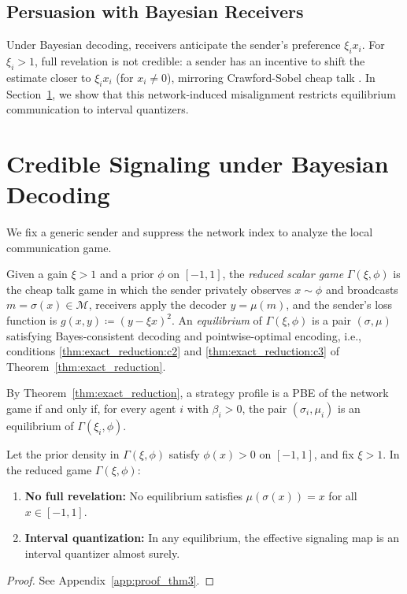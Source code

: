 \documentclass[journal,twoside,web]{ieeecolor}
\begin{document}
\subsection{Persuasion with Bayesian Receivers}
\label{subsec:credibility_gap}

Under Bayesian decoding, receivers anticipate the sender's preference $\xi_i x_i$. For $\xi_i > 1$, full revelation is not credible: a sender has an incentive to shift the estimate closer to $\xi_i x_i$ (for $x_i\neq0$), mirroring Crawford-Sobel cheap talk \cite{crawford1982strategic,melumad1991communication}. In Section~\ref{sec:credible_signaling}, we show that this network-induced misalignment restricts equilibrium communication to interval quantizers.

\section{Credible Signaling under Bayesian Decoding}
\label{sec:credible_signaling}
We fix a generic sender and suppress the network index to analyze the local communication game.

\begin{definition}
    \label{def:reduced_game}
    Given a gain $\xi>1$ and a prior $\phi$ on $[-1,1]$, the \emph{reduced scalar game} $\Gamma(\xi,\phi)$ is the cheap talk game in which the sender privately observes $x\sim\phi$ and broadcasts $m=\sigma(x)\in\mathcal M$, receivers apply the decoder $y=\mu(m)$, and the sender's loss function is $g(x,y)\coloneqq(y-\xi x)^2$. An \emph{equilibrium} of $\Gamma(\xi,\phi)$ is a pair $(\sigma,\mu)$ satisfying Bayes-consistent decoding and pointwise-optimal encoding, i.e., conditions \ref{thm:exact_reduction:c2} and \ref{thm:exact_reduction:c3} of Theorem~\ref{thm:exact_reduction}.
\end{definition}

By Theorem~\ref{thm:exact_reduction}, a strategy profile is a PBE of the network game if and only if, for every agent $i$ with $\beta_i>0$, the pair $(\sigma_i,\mu_i)$ is an equilibrium of $\Gamma(\xi_i,\phi)$.

\begin{theorem}
    \label{thm:credibility_and_structure}
    Let the prior density in $\Gamma(\xi,\phi)$ satisfy $\phi(x)>0$ on $[-1,1]$, and fix $\xi>1$. In the reduced game $\Gamma(\xi,\phi)$:
    \begin{enumerate}[wide, label=\roman*), ref=(\roman*)]
        \item \textbf{No full revelation:} No equilibrium satisfies
              $\mu(\sigma(x))=x$ for all $x \in [-1,1]$.
              \label{thm:credibility_and_structure:1}

        \item \textbf{Interval quantization:} In any equilibrium, the effective
              signaling map is an interval quantizer almost surely.
              \label{thm:credibility_and_structure:2}
    \end{enumerate}
\end{theorem}
\begin{proof}
    See Appendix~\ref{app:proof_thm3}.
\end{proof}
\end{document}
